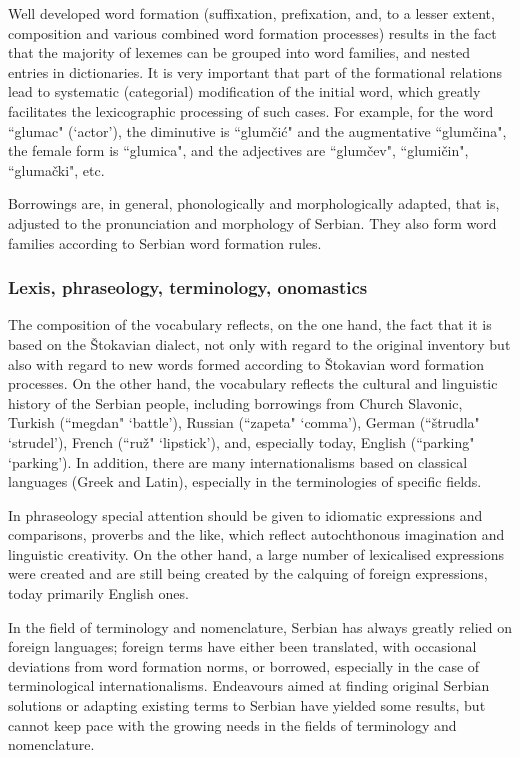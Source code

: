 \begin{multicols}{2}
Well developed word formation (suffixation, prefixation, and, to a lesser extent, composition and various combined word formation processes) results in the fact that the majority of lexemes can be grouped into word families, and nested entries in dictionaries. It is very important that part of the formational relations lead to systematic (categorial) modification of the initial word, which greatly facilitates the lexicographic processing of such cases. For example, for the word ``glumac" (‘actor’), the diminutive is ``glumčić" and the augmentative ``glumčina", the female form is ``glumica", and the adjectives are ``glumčev", ``glumičin", ``glumački", etc.

Borrowings are, in general, phonologically and morphologically adapted, that is, adjusted to the pronunciation and morphology of Serbian. They also form word families according to Serbian word formation rules.

\subsubsection {Lexis, phraseology, terminology, onomastics}

The composition of the vocabulary reflects, on the one hand, the fact that it is based on the Štokavian dialect, not only with regard to the original inventory but also with regard to new words formed according to Štokavian word formation processes. On the other hand, the vocabulary reflects the cultural and linguistic history of the Serbian people, including borrowings from Church Slavonic, Turkish (``megdan" ‘battle’), Russian (``zapeta" ‘comma’), German (``štrudla" ‘strudel’), French (``ruž" ‘lipstick’), and, especially today, English (``parking" ‘parking’). In addition, there are many internationalisms based on classical languages (Greek and Latin), especially in the terminologies of specific fields.

In phraseology special attention should be given to idiomatic expressions and comparisons, proverbs and the like, which reflect autochthonous imagination and linguistic creativity. On the other hand, a large number of lexicalised expressions were created and are still being created by the calquing of foreign expressions, today primarily English ones.

In the field of terminology and nomenclature, Serbian has always greatly relied on foreign languages; foreign terms have either been translated, with occasional deviations from word formation norms, or borrowed, especially in the case of terminological internationalisms. Endeavours aimed at finding original Serbian solutions or adapting existing terms to Serbian have yielded some results, but cannot keep pace with the growing needs in the fields of terminology and nomenclature. 


\end{multicols}
